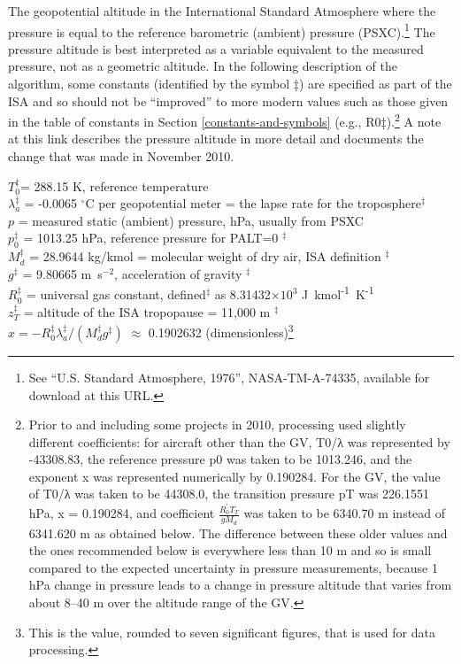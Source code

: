 \documentclass[
  english,
]{book}
\begin{document}
The geopotential altitude in the International Standard Atmosphere where the pressure is equal to the reference barometric (ambient) pressure (PSXC).\footnote{See ``U.S. Standard Atmosphere, 1976'', NASA-TM-A-74335, available for download at this URL.}
The pressure altitude is best interpreted as a variable equivalent to the measured pressure, not as a geometric altitude. In the following description of the algorithm, some constants (identified by the symbol {‡}) are specified as part of the ISA and so should not be ``improved'' to more modern values such as those given in the table of constants in Section \ref{constants-and-symbols} (e.g., {R0‡).}\footnote{Prior to and including some projects in 2010, processing used slightly different coefficients: for aircraft other than the GV, {T0/λ} was represented by -43308.83, the reference pressure {p0} was taken to be 1013.246, and the exponent {x} was represented numerically by 0.190284. For the GV, the value of {T0/λ} was taken to be 44308.0, the transition pressure {pT} was 226.1551 hPa, {x} = 0.190284, and coefficient {\(\frac{R_{0}^{\prime}T_{T}}{gM_{d}}\)} was taken to be 6340.70 m instead of 6341.620 m as obtained below. The difference between these older values and the ones recommended below is everywhere less than 10 m and so is small compared to the expected uncertainty in pressure measurements, because 1 hPa change in pressure leads to a change in pressure altitude that varies from about 8--40 m over the altitude range of the GV.}
A note at this link describes the pressure altitude in more detail and documents the change that was made in November 2010.

\(T_{0}^{\ddagger}\)= 288.15 K, reference temperature\\
\(\lambda_{a}^{\ddagger}\) =
-0.0065 \(^{\circ}\)C per geopotential meter = the lapse rate for the troposphere\(^{\ddagger}\)\\
\(p\) = measured static (ambient) pressure, hPa, usually from PSXC\\
\(p_{0}^{\ddagger}\) = 1013.25 hPa, reference pressure for PALT=0 \(^{\ddagger}\)\\
\(M_{d}^{\ddagger}\) = 28.9644 kg/kmol = molecular weight of dry
air, ISA definition \(^{\ddagger}\)\\
\(g^{\ddagger}\) = 9.80665 m~s\(^{-2}\), acceleration of gravity \(^{\ddagger}\)\\
\(R_{0}^{\ddagger}\) = universal gas constant, defined\(^{\ddagger}\)
as 8.31432\(\times10^{3}\) J~kmol\textsuperscript{-1}~K\textsuperscript{-1}\\
\(z_{T}^{\ddagger}\) = altitude of the ISA tropopause = 11,000 m \(^{\ddagger}\)\\
\(x=-R_{0}^{\ddagger}\lambda_{a}^{\ddagger}/(M_{d}^{\ddagger}g^{\ddagger})\)
\(\approx\) 0.1902632 (dimensionless)\footnote{This is the value, rounded to seven significant figures, that is used for data processing.}
\end{document}
